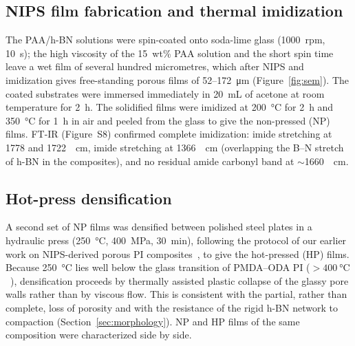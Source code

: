\documentclass[preprint,a4paper]{elsarticle}
\begin{document}
\subsection{NIPS film fabrication and thermal imidization}
\label{sec:nips}
The PAA/h-BN solutions were spin-coated onto soda-lime glass (\SI{1000}{rpm}, \SI{10}{\second}); the high viscosity of the 15~wt\% PAA solution and the short spin time leave a wet film of several hundred micrometres, which after NIPS and imidization gives free-standing porous films of 52--\SI{172}{\micro\meter} (Figure~\ref{fig:sem}). The coated substrates were immersed immediately in \SI{20}{\milli\liter} of acetone at room temperature for \SI{2}{\hour}. The solidified films were imidized at \SI{200}{\celsius} for \SI{2}{\hour} and \SI{350}{\celsius} for \SI{1}{\hour} in air and peeled from the glass to give the non-pressed (NP) films. FT-IR (Figure~S8) confirmed complete imidization: imide  stretching at 1778 and \SI{1722}{\per\cm}, imide  stretching at \SI{1366}{\per\cm} (overlapping the B--N stretch of h-BN in the composites), and no residual amide carbonyl band at $\sim$\SI{1660}{\per\cm}.

\subsection{Hot-press densification}
\label{sec:hotpress}
A second set of NP films was densified between polished steel plates in a hydraulic press (\SI{250}{\celsius}, \SI{400}{\mega\pascal}, \SI{30}{\minute}), following the protocol of our earlier work on NIPS-derived porous PI composites~\cite{kim2021flexible}, to give the hot-pressed (HP) films. Because \SI{250}{\celsius} lies well below the glass transition of PMDA--ODA PI ($>\SI{400}{\celsius}$~\cite{kim2021flexible}), densification proceeds by thermally assisted plastic collapse of the glassy pore walls rather than by viscous flow. This is consistent with the partial, rather than complete, loss of porosity and with the resistance of the rigid h-BN network to compaction (Section~\ref{sec:morphology}). NP and HP films of the same composition were characterized side by side.
\end{document}
